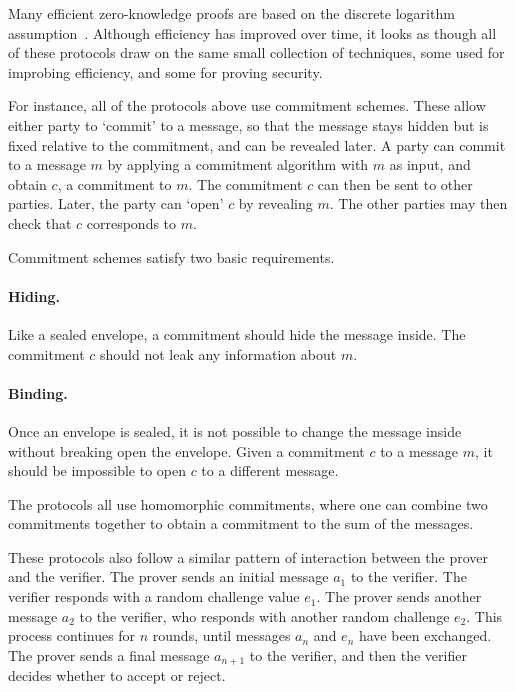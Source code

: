 Many efficient zero-knowledge proofs are based on the discrete logarithm assumption~\cite{Schnorr91,Cramer1998a,Groth2009b,Seo2011a,BootleCCGP16,BunzBBPWM18,GrothK15,BootleCCGGP15,BayerG13,BootleG18}. Although efficiency has improved over time, it looks as though all of these protocols draw on the same small collection of techniques, some used for improbing efficiency, and some for proving security.

For instance, all of the protocols above use commitment schemes. These allow either party to `commit' to a message, so that the message stays hidden but is fixed relative to the commitment, and can be revealed later. A party can commit to a message $m$ by applying a commitment algorithm with $m$ as input, and obtain $c$, a commitment to $m$. The commitment $c$ can then be sent to other parties. Later, the party can `open' $c$ by revealing $m$. The other parties may then check that $c$ corresponds to $m$.

Commitment schemes satisfy two basic requirements.

\paragraph{Hiding.} Like a sealed envelope, a commitment should hide the message inside. The commitment $c$ should not leak any information about $m$.

\paragraph{Binding.} Once an envelope is sealed, it is not possible to change the message inside without breaking open the envelope. Given a commitment $c$ to a message $m$, it should be impossible to open $c$ to a different message.

The protocols all use homomorphic commitments, where one can combine two commitments together to obtain a commitment to the sum of the messages.

These protocols also follow a similar pattern of interaction between the prover and the verifier. The prover sends an initial message $a_1$ to the verifier. The verifier responds with a random challenge value $e_1$. The prover sends another message $a_2$ to the verifier, who responds with another random challenge $e_2$. This process continues for $n$ rounds, until messages $a_n$ and $e_n$ have been exchanged. The prover sends a final message $a_{n+1}$ to the verifier, and then the verifier decides whether to accept or reject.

